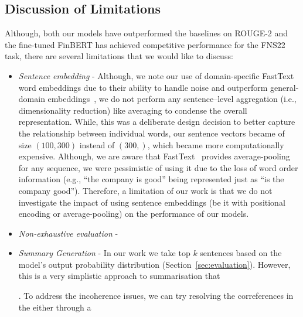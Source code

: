 \subsection{Discussion of Limitations}\label{subsec:limitations}
Although, both our models have outperformed the baselines on ROUGE-2 and the fine-tuned FinBERT has achieved competitive
performance for the FNS22 task, there are several limitations that we would like to discuss:
\begin{itemize}
    \item \emph{Sentence embedding} - Although, we note our use of domain-specific FastText word embeddings due to their
    ability to handle noise and outperform general-domain embeddings~\cite{rahimikia2021realised}, we do not perform
    any sentence--level aggregation (i.e., dimensionality reduction) like averaging to condense the overall representation.
    While, this was a deliberate design decision to better capture the relationship between individual words,
    our sentence vectors became of size $(100, 300)$ instead of $(300,)$, which became more computationally expensive.
    Although, we are aware that FastText~\cite{bojanowski-etal-2017-enriching} provides average-pooling for any sequence,
    we were pessimistic of using it due to the loss of word order information (e.g., ``the company is good'' being represented just as ``is the company good'').
    Therefore, a limitation of our work is that we do not investigate the impact of using sentence embeddings
    (be it with positional encoding or average-pooling) on the performance of our models.
    \item \emph{Non-exhaustive evaluation} -
    \item \emph{Summary Generation} - In our work we take top $k$ sentences based on the model's output probability distribution (Section~\ref{sec:evaluation}).
        However, this is a very simplistic approach to summarisation that
        .
        To address the incoherence issues, we can try resolving the correferences in the either through a

\end{itemize}
